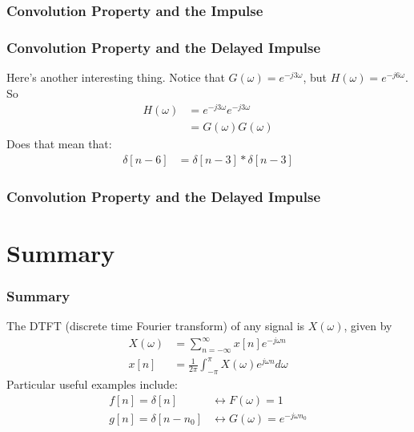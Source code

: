 \documentclass{beamer}
\begin{document}
\begin{frame}
  \frametitle{Convolution Property and the Impulse}

  \centerline{}
\end{frame}

\begin{frame}
  \frametitle{Convolution Property and the Delayed Impulse}

  Here's another interesting thing.  Notice that
  $G(\omega)=e^{-j3\omega}$, but $H(\omega)=e^{-j6\omega}$.  So
  \begin{align*}
    H(\omega) &= e^{-j3\omega}e^{-j3\omega}\\
    &= G(\omega)G(\omega)
  \end{align*}
  Does that mean that:
  \begin{align*}
    \delta[n-6] &= \delta[n-3]\ast \delta[n-3]
  \end{align*}
\end{frame}

\begin{frame}
  \frametitle{Convolution Property and the Delayed Impulse}

  \centerline{}
\end{frame}

\section[Summary]{Summary}
\setcounter{subsection}{1}

\begin{frame}
  \frametitle{Summary}

  The DTFT (discrete time Fourier transform) of any signal is
  $X(\omega)$, given by
  \begin{align*}
    X(\omega) &= \sum_{n=-\infty}^\infty x[n]e^{-j\omega n}\\
    x[n] &= \frac{1}{2\pi}\int_{-\pi}^\pi X(\omega)e^{j\omega n}d\omega
  \end{align*}
  Particular useful examples include:
  \begin{align*}
    f[n]=\delta[n] &\leftrightarrow F(\omega)=1\\
    g[n]=\delta[n-n_0] &\leftrightarrow G(\omega)=e^{-j\omega n_0}
  \end{align*}
\end{frame}
\end{document}
